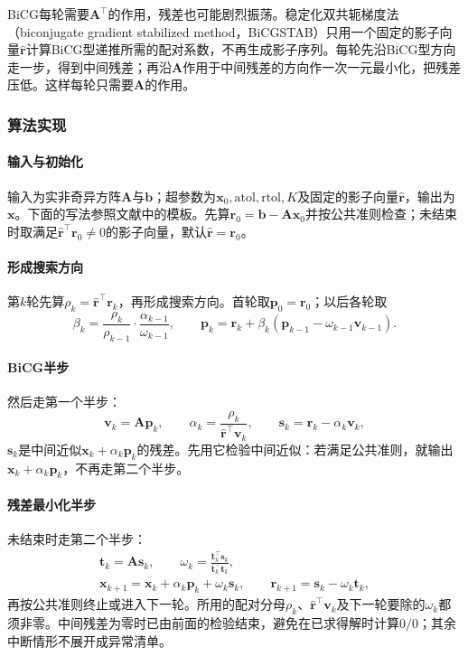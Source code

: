 BiCG每轮需要$\bm A^\top$的作用，残差也可能剧烈振荡。稳定化双共轭梯度法（biconjugate gradient stabilized method，BiCGSTAB）只用一个固定的影子向量$\widehat{\bm r}$计算BiCG型递推所需的配对系数，不再生成影子序列。每轮先沿BiCG型方向走一步，得到中间残差；再沿$\bm A$作用于中间残差的方向作一次一元最小化，把残差压低。这样每轮只需要$\bm A$的作用。

\subsubsection{算法实现}

\paragraph{输入与初始化}
输入为实非奇异方阵$\bm A$与$\bm b$；超参数为$\bm x_0,\mathrm{atol},\mathrm{rtol},K$及固定的影子向量$\widehat{\bm r}$，输出为$\bm x$。下面的写法参照文献中的模板。先算$\bm r_0=\bm b-\bm A\bm x_0$并按公共准则检查；未结束时取满足$\widehat{\bm r}^\top\bm r_0\ne0$的影子向量，默认$\widehat{\bm r}=\bm r_0$。

\paragraph{形成搜索方向}
第$k$轮先算$\rho_k=\widehat{\bm r}^\top\bm r_k$，再形成搜索方向。首轮取$\bm p_0=\bm r_0$；以后各轮取
\[
 \beta_k=\frac{\rho_k}{\rho_{k-1}}\cdot\frac{\alpha_{k-1}}{\omega_{k-1}},\qquad
 \bm p_k=\bm r_k+\beta_k(\bm p_{k-1}-\omega_{k-1}\bm v_{k-1}).
\]

\paragraph{BiCG半步}
然后走第一个半步：
\[
 \bm v_k=\bm A\bm p_k,\qquad
 \alpha_k=\frac{\rho_k}{\widehat{\bm r}^\top\bm v_k},\qquad
 \bm s_k=\bm r_k-\alpha_k\bm v_k ,
\]
$\bm s_k$是中间近似$\bm x_k+\alpha_k\bm p_k$的残差。先用它检验中间近似：若满足公共准则，就输出$\bm x_k+\alpha_k\bm p_k$，不再走第二个半步。

\paragraph{残差最小化半步}
未结束时走第二个半步：
\[
 \begin{gathered}
 \bm t_k=\bm A\bm s_k,\qquad \omega_k=\frac{\bm t_k^\top\bm s_k}{\bm t_k^\top\bm t_k},\\
 \bm x_{k+1}=\bm x_k+\alpha_k\bm p_k+\omega_k\bm s_k,\qquad
 \bm r_{k+1}=\bm s_k-\omega_k\bm t_k ,
 \end{gathered}
\]
再按公共准则终止或进入下一轮。所用的配对分母$\rho_k$、$\widehat{\bm r}^\top\bm v_k$及下一轮要除的$\omega_k$都须非零。中间残差为零时已由前面的检验结束，避免在已求得解时计算$0/0$；其余中断情形不展开成异常清单。

